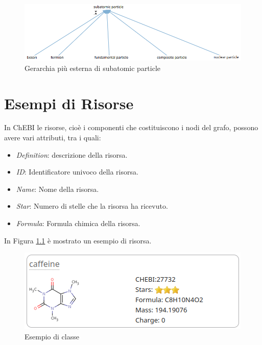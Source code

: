 \documentclass[12pt,a4paper,openright,twoside]{book}
\begin{document}
\begin{figure}[H]
	\centering
	\includegraphics[width=\linewidth]{figures/subatomic-particle.png}
	\caption{Gerarchia più esterna di subatomic particle}
	\label{fig:SubatomicParticle}
\end{figure}

\chapter{Esempi di Risorse}
\label{chap:classexamples}

In ChEBI le risorse, cioè i componenti che costituiscono i nodi del grafo, possono avere vari attributi, tra i quali:
\begin{itemize}
	\item \textit{Definition}: descrizione della risorsa.
	\item \textit{ID}: Identificatore univoco della risorsa.
	\item \textit{Name}: Nome della risorsa.
	\item \textit{Star}: Numero di stelle che la risorsa ha ricevuto.
	\item \textit{Formula}: Formula chimica della risorsa.
\end{itemize}

In Figura \ref{fig:Class} è mostrato un esempio di risorsa.

\begin{figure}[H]
	\centering
	\includegraphics[width=\linewidth]{figures/class.png}
	\caption{Esempio di classe}
	\label{fig:Class}
\end{figure}
\end{document}
